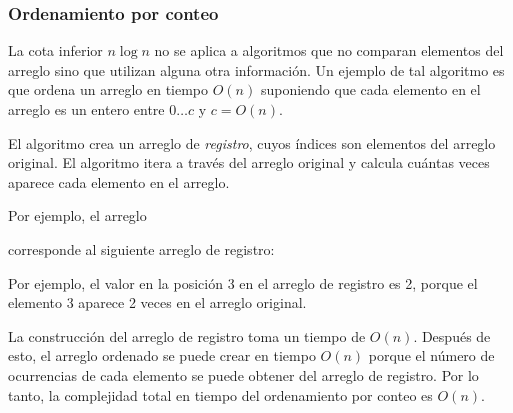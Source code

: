\subsubsection{Ordenamiento por conteo}


La cota inferior $n \log n$ no se aplica a
algoritmos que no comparan elementos del arreglo
sino que utilizan alguna otra información.
Un ejemplo de tal algoritmo es
 que ordena un arreglo en
tiempo $O(n)$ suponiendo que cada elemento en el arreglo
es un entero entre $0 \ldots c$ y $c=O(n)$.

El algoritmo crea un arreglo de \emph{registro},
cuyos índices son elementos del arreglo original.
El algoritmo itera a través del arreglo original
y calcula cuántas veces aparece cada elemento
en el arreglo.
\newpage

Por ejemplo, el arreglo
\begin{center}
\end{center}
corresponde al siguiente arreglo de registro:
\begin{center}
\end{center}

Por ejemplo, el valor en la posición 3
en el arreglo de registro es 2,
porque el elemento 3 aparece 2 veces
en el arreglo original.

La construcción del arreglo de registro
toma un tiempo de $O(n)$. Después de esto, el arreglo ordenado
se puede crear en tiempo $O(n)$ porque
el número de ocurrencias de cada elemento se puede obtener
del arreglo de registro.
Por lo tanto, la complejidad total en tiempo del
ordenamiento por conteo es $O(n)$.

